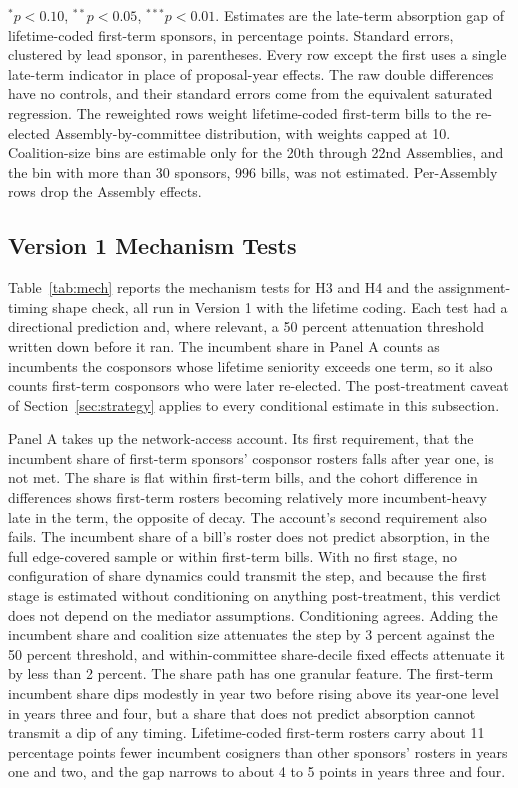 \documentclass[11pt]{article}
\begin{document}
\begin{table}[H]
\smallskip
\begin{minipage}{0.95\textwidth}
\footnotesize $^{*}p<0.10$, $^{**}p<0.05$, $^{***}p<0.01$. Estimates are the late-term absorption gap of lifetime-coded first-term sponsors, in percentage points. Standard errors, clustered by lead sponsor, in parentheses. Every row except the first uses a single late-term indicator in place of proposal-year effects. The raw double differences have no controls, and their standard errors come from the equivalent saturated regression. The reweighted rows weight lifetime-coded first-term bills to the re-elected Assembly-by-committee distribution, with weights capped at 10. Coalition-size bins are estimable only for the 20th through 22nd Assemblies, and the bin with more than 30 sponsors, 996 bills, was not estimated. Per-Assembly rows drop the Assembly effects.
\end{minipage}
\end{table}

\subsection{Version 1 Mechanism Tests}

Table~\ref{tab:mech} reports the mechanism tests for H3 and H4 and the assignment-timing shape check, all run in Version 1 with the lifetime coding. Each test had a directional prediction and, where relevant, a 50 percent attenuation threshold written down before it ran. The incumbent share in Panel A counts as incumbents the cosponsors whose lifetime seniority exceeds one term, so it also counts first-term cosponsors who were later re-elected. The post-treatment caveat of Section~\ref{sec:strategy} applies to every conditional estimate in this subsection.

Panel A takes up the network-access account. Its first requirement, that the incumbent share of first-term sponsors' cosponsor rosters falls after year one, is not met. The share is flat within first-term bills, and the cohort difference in differences shows first-term rosters becoming relatively more incumbent-heavy late in the term, the opposite of decay. The account's second requirement also fails. The incumbent share of a bill's roster does not predict absorption, in the full edge-covered sample or within first-term bills. With no first stage, no configuration of share dynamics could transmit the step, and because the first stage is estimated without conditioning on anything post-treatment, this verdict does not depend on the mediator assumptions. Conditioning agrees. Adding the incumbent share and coalition size attenuates the step by 3 percent against the 50 percent threshold, and within-committee share-decile fixed effects attenuate it by less than 2 percent. The share path has one granular feature. The first-term incumbent share dips modestly in year two before rising above its year-one level in years three and four, but a share that does not predict absorption cannot transmit a dip of any timing. Lifetime-coded first-term rosters carry about 11 percentage points fewer incumbent cosigners than other sponsors' rosters in years one and two, and the gap narrows to about 4 to 5 points in years three and four.
\end{document}
